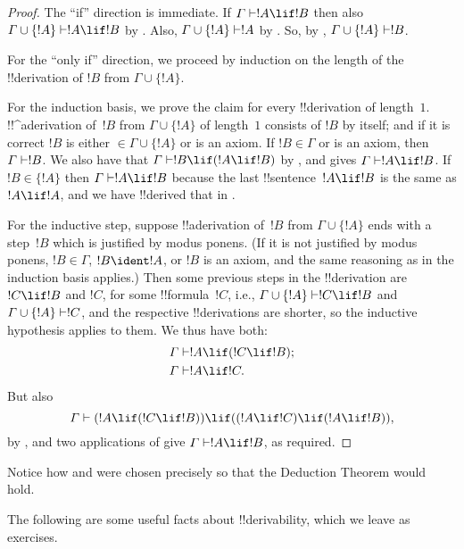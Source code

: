 \documentclass[../../../include/open-logic-section]{subfiles}
\begin{document}
\begin{proof}
The ``if'' direction is immediate.  If $\Gamma \Proves !A \lif !B$
then also $\Gamma \cup \{!A\} \Proves !A \lif !B$ by
.  Also, $\Gamma \cup \{!A\} \Proves !A$ by
. So, by , $\Gamma \cup
\{!A\} \Proves !B$.

For the ``only if'' direction, we proceed by induction on the length
of the !!{derivation} of $!B$ from $\Gamma \cup \{!A\}$.

For the induction basis, we prove the claim for every !!{derivation}
of length~$1$. !!^a{derivation} of~$!B$ from $\Gamma \cup \{!A\}$ of
length~$1$ consists of $!B$ by itself; and if it is correct $!B$ is
either $\in \Gamma \cup \{!A\}$ or is an axiom.  If $!B \in \Gamma$ or
is an axiom, then $\Gamma \Proves !B$. We also have that $\Gamma
\Proves !B \lif (!A \lif !B)$ by , and
 gives $\Gamma \Proves !A \lif !B$. If $!B \in \{ !A\}$
then $\Gamma \Proves !A \lif !B$ because the last !!{sentence}~$!A
\lif !B$ is the same as $!A \lif !A$, and we have !!{derive}d that in
.

For the inductive step, suppose !!a{derivation} of~$!B$ from
$\Gamma \cup \{!A\}$ ends with a step~$!B$ which is justified by modus
ponens. (If it is not justified by modus ponens, $!B \in \Gamma$, $!B
\ident !A$, or $!B$ is an axiom, and the same reasoning as in the
induction basis applies.) Then some previous steps in the
!!{derivation} are $!C \lif !B$ and $!C$, for some !!{formula}~$!C$,
i.e., $\Gamma \cup \{!A\} \Proves !C \lif !B$ and $\Gamma \cup \{!A\}
\Proves !C$, and the respective !!{derivation}s are shorter, so the
inductive hypothesis applies to them. We thus have both:
\begin{align*}
  & \Gamma \Proves !A \lif (!C \lif !B); \\
  & \Gamma \Proves !A \lif !C.
\end{align*}
But also
\[
\Gamma \Proves (!A \lif (!C \lif !B)) \lif
((!A\lif !C)  \lif (!A \lif !B)),
\]
by , and two applications of  give
$\Gamma \Proves !A \lif !B$, as required.
\end{proof}

Notice how  and  were chosen
precisely so that the Deduction Theorem would hold.

The following are some useful facts about !!{derivability}, which we
leave as exercises.
\end{document}
